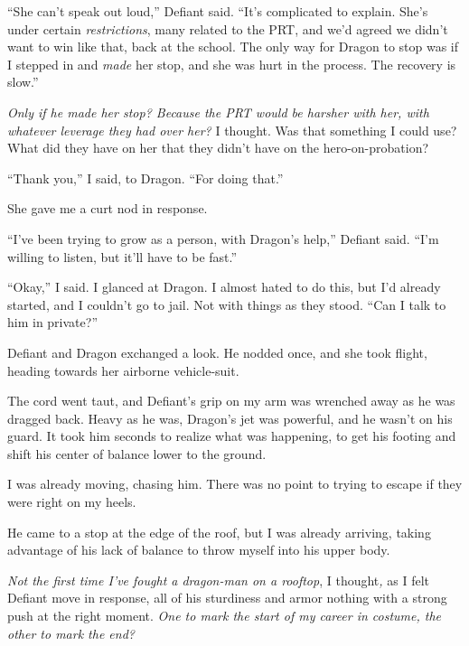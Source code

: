 ``She can't speak out loud,'' Defiant said.  ``It's complicated to explain.  She's under certain \emph{restrictions}, many related to the PRT, and we'd agreed we didn't want to win like that, back at the school.  The only way for Dragon to stop was if I stepped in and \emph{made} her stop, and she was hurt in the process.  The recovery is slow.''



\emph{Only if he made her stop?  Because the PRT would be harsher with her, with whatever leverage they had over her? } I thought.  Was that something I could use?  What did they have on her that they didn't have on the hero-on-probation?



``Thank you,'' I said, to Dragon.  ``For doing that.''



She gave me a curt nod in response.



``I've been trying to grow as a person, with Dragon's help,'' Defiant said.  ``I'm willing to listen, but it'll have to be fast.''



``Okay,'' I said.  I glanced at Dragon.  I almost hated to do this, but I'd already started, and I couldn't go to jail.  Not with things as they stood.  ``Can I talk to him in private?''



Defiant and Dragon exchanged a look.  He nodded once, and she took flight, heading towards her airborne vehicle-suit.



The cord went taut, and Defiant's grip on my arm was wrenched away as he was dragged back.  Heavy as he was, Dragon's jet was powerful, and he wasn't on his guard.  It took him seconds to realize what was happening, to get his footing and shift his center of balance lower to the ground.



I was already moving, chasing him.  There was no point to trying to escape if they were right on my heels.



He came to a stop at the edge of the roof, but I was already arriving, taking advantage of his lack of balance to throw myself into his upper body.



\emph{Not the first time I've fought a dragon-man on a rooftop}, I thought\emph{, }as I felt Defiant move in response, all of his sturdiness and armor nothing with a strong push at the right moment.  \emph{One to mark the start of my career in costume, the other to mark the end?}



